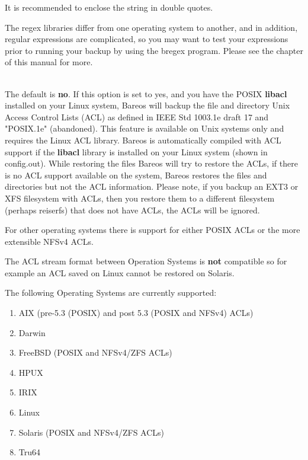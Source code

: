 \begin{description}
   It is recommended to enclose the string in double quotes.

   The regex libraries differ from one operating system to
   another, and in addition, regular expressions are complicated,
   so you may want to test your expressions prior to running your
   backup by using the bregex program. Please see the
    chapter of this manual for
   more.



\item [aclsupport=yes{\textbar}no] \hfill \\
\label{ACLSupport}
   The default is {\bf no}.  If this option is set to yes, and you have the
   POSIX {\bf libacl} installed on your Linux system, Bareos will backup the
   file and directory Unix Access Control Lists (ACL) as defined in IEEE Std
   1003.1e draft 17 and "POSIX.1e" (abandoned).  This feature is
   available on Unix systems only and requires the Linux ACL library. Bareos is
   automatically compiled with ACL support if the {\bf libacl} library is
   installed on your Linux system (shown in config.out).  While restoring the
   files Bareos will try to restore the ACLs, if there is no ACL support
   available on the system, Bareos restores the files and directories but
   not the ACL information.  Please note, if you backup an EXT3 or XFS
   filesystem with ACLs, then you restore them to a different filesystem
   (perhaps reiserfs) that does not have ACLs, the ACLs will be ignored.

   For other operating systems there is support for either POSIX ACLs or
   the more extensible NFSv4 ACLs.

   The ACL stream format between Operation Systems is \textbf{not}
   compatible so for example an ACL saved on Linux cannot be restored on
   Solaris.

   The following Operating Systems are currently supported:

   \begin{enumerate}
   \item AIX (pre-5.3 (POSIX) and post 5.3 (POSIX and NFSv4) ACLs)
   \item Darwin
   \item FreeBSD (POSIX and NFSv4/ZFS ACLs)
   \item HPUX
   \item IRIX
   \item Linux
   \item Solaris (POSIX and NFSv4/ZFS ACLs)
   \item Tru64
   \end{enumerate}


\end{description}
